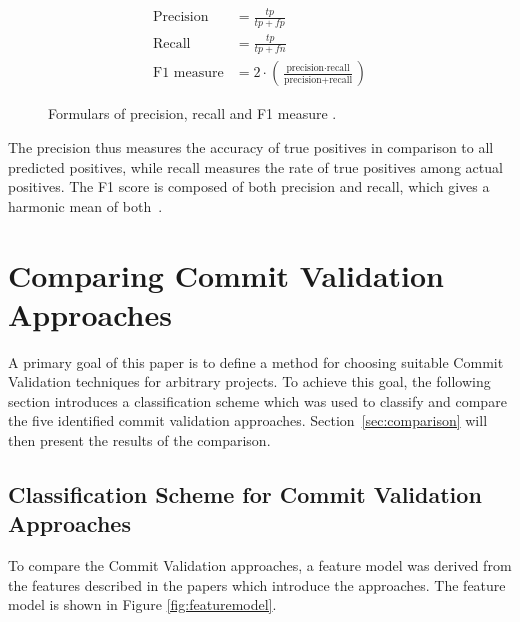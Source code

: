 \begin{figure}[t]
	\centering
	\begin{align*}
	\text{Precision} &= \frac{tp}{tp+fp}\\
	\text{Recall} &= \frac{tp}{tp+fn}\\
	\text{F1 measure} &= 2 \cdot \left( \frac{\text{precision} \cdot \text{recall}}{\text{precision} + \text{recall}} \right)
	\end{align*}
	\caption{Formulars of precision, recall and F1 measure \cite{Powers2007}.}
	\label{fig:formulas}
\end{figure}

The precision thus measures the accuracy of true positives in comparison to all predicted positives, while recall measures the rate of true positives among actual positives. The F1 score is composed of both precision and recall,
which gives a harmonic mean of both~\cite{Powers2007}.


\section{Comparing Commit Validation Approaches}
\label{sec:comparingapproaches}

A primary goal of this paper is to define a method for choosing suitable Commit Validation techniques for arbitrary projects. To achieve this goal, the following section introduces a classification scheme which was used to classify and compare the five identified commit validation approaches. Section~\ref{sec:comparison} will then present the results of the comparison.

\subsection{Classification Scheme for Commit Validation Approaches}
\label{sec:scheme}

To compare the Commit Validation approaches, a feature model was derived from the features described in the papers which introduce the approaches. The feature model is shown in Figure \ref{fig:featuremodel}.


